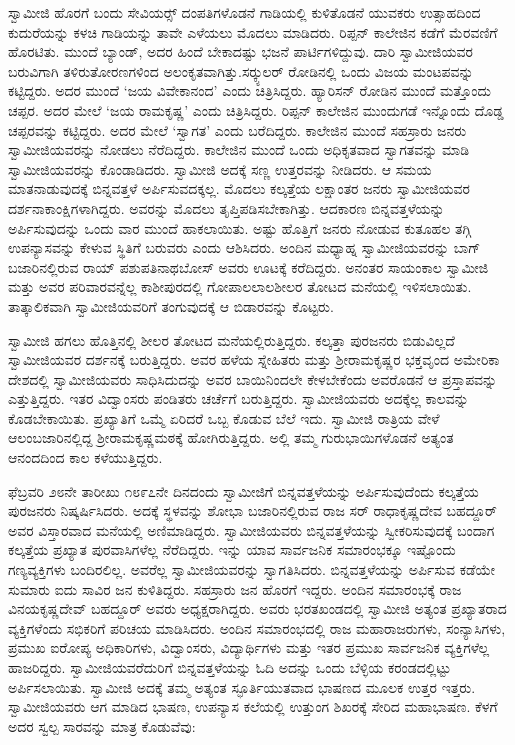  ಸ್ವಾಮೀಜಿ ಹೊರಗೆ ಬಂದು ಸೇವಿಯರ್ಸ್‍‍ ದಂಪತಿಗಳೊಡನೆ ಗಾಡಿಯಲ್ಲಿ ಕುಳಿತೊಡನೆ ಯುವಕರು ಉತ್ಸಾಹದಿಂದ ಕುದುರೆಯನ್ನು ಕಳಚಿ ಗಾಡಿಯನ್ನು ತಾವೇ ಎಳೆಯಲು ಮೊದಲು ಮಾಡಿದರು. ರಿಪ್ಪನ್ ಕಾಲೇಜಿನ ಕಡೆಗೆ ಮೆರವಣಿಗೆ ಹೊರಟಿತು. ಮುಂದೆ ಬ್ಯಾಂಡ್, ಅದರ ಹಿಂದೆ ಬೇಕಾದಷ್ಟು ಭಜನೆ ಪಾರ್ಟಿಗಳಿದ್ದುವು. ದಾರಿ ಸ್ವಾಮೀಜಿಯವರ ಬರುವಿಗಾಗಿ ತಳಿರುತೋರಣಗಳಿಂದ ಅಲಂಕೃತವಾಗಿತ್ತು.\break ಸರ್‍ಕ್ಯುಲರ್ ರೋಡಿನಲ್ಲಿ ಒಂದು ವಿಜಯ ಮಂಟಪವನ್ನು ಕಟ್ಟಿದ್ದರು. ಅದರ ಮುಂದೆ ‘ಜಯ ವಿವೇಕಾನಂದ’ ಎಂದು ಚಿತ್ರಿಸಿದ್ದರು. ಹ್ಯಾರಿಸನ್ ರೋಡಿನ ಮುಂದೆ ಮತ್ತೊಂದು ಚಪ್ಪರ. ಅದರ ಮೇಲೆ ‘ಜಯ ರಾಮಕೃಷ್ಣ’ ಎಂದು ಚಿತ್ರಿಸಿದ್ದರು. ರಿಪ್ಪನ್ ಕಾಲೇಜಿನ ಮುಂದುಗಡೆ ಇನ್ನೊಂದು ದೊಡ್ಡ ಚಪ್ಪರವನ್ನು ಕಟ್ಟಿದ್ದರು. ಅದರ ಮೇಲೆ ‘ಸ್ವಾಗತ’ ಎಂದು ಬರೆದಿದ್ದರು. ಕಾಲೇಜಿನ ಮುಂದೆ ಸಹಸ್ರಾರು ಜನರು ಸ್ವಾಮೀಜಿಯವರನ್ನು ನೋಡಲು ನೆರೆದಿದ್ದರು. ಕಾಲೇಜಿನ ಮುಂದೆ ಒಂದು ಅಧಿಕೃತವಾದ ಸ್ವಾಗತವನ್ನು ಮಾಡಿ ಸ್ವಾಮೀಜಿಯವರನ್ನು ಕೊಂಡಾಡಿದರು. ಸ್ವಾಮೀಜಿ ಅದಕ್ಕೆ ಸಣ್ಣ ಉತ್ತರವನ್ನು ನೀಡಿದರು. ಆ ಸಮಯ ಮಾತನಾಡುವುದಕ್ಕೆ ಬಿನ್ನವತ್ತಳೆ ಅರ್ಪಿಸುವದಕ್ಕಲ್ಲ. ಮೊದಲು ಕಲ್ಕತ್ತೆಯ ಲಕ್ಷಾಂತರ ಜನರು ಸ್ವಾಮೀಜಿಯವರ ದರ್ಶನಾಕಾಂಕ್ಷಿಗಳಾಗಿದ್ದರು. ಅವರನ್ನು ಮೊದಲು ತೃಪ್ತಿಪಡಿಸಬೇಕಾಗಿತ್ತು. ಆದಕಾರಣ ಬಿನ್ನವತ್ತಳೆಯನ್ನು ಅರ್ಪಿಸುವುದನ್ನು ಒಂದು ವಾರ ಮುಂದೆ ಹಾಕಲಾಯಿತು. ಅಷ್ಟು ಹೊತ್ತಿಗೆ ಜನರು ನೋಡುವ ಕುತೂಹಲ ತಗ್ಗಿ ಉಪನ್ಯಾಸವನ್ನು ಕೇಳುವ ಸ್ಥಿತಿಗೆ ಬರುವರು ಎಂದು ಆಶಿಸಿದರು. ಅಂದಿನ ಮಧ್ಯಾಹ್ನ ಸ್ವಾಮೀಜಿಯವರನ್ನು ಬಾಗ್ ಬಜಾರಿನಲ್ಲಿರುವ ರಾಯ್ ಪಶುಪತಿನಾಥಬೋಸ್ ಅವರು ಊಟಕ್ಕೆ ಕರೆದಿದ್ದರು. ಅನಂತರ ಸಾಯಂಕಾಲ ಸ್ವಾಮೀಜಿ ಮತ್ತು ಅವರ ಪರಿವಾರವನ್ನೆಲ್ಲ ಕಾಶೀಪುರದಲ್ಲಿ ಗೋಪಾಲಲಾಲಶೀಲರ ತೋಟದ ಮನೆಯಲ್ಲಿ ಇಳಿಸಲಾಯಿತು. ತಾತ್ಕಾಲಿಕವಾಗಿ ಸ್ವಾಮೀಜಿಯವರಿಗೆ ತಂಗುವುದಕ್ಕೆ ಆ ಬಿಡಾರವನ್ನು ಕೊಟ್ಟರು. 

 ಸ್ವಾಮೀಜಿ ಹಗಲು ಹೊತ್ತಿನಲ್ಲಿ ಶೀಲರ ತೋಟದ ಮನೆಯಲ್ಲಿರುತ್ತಿದ್ದರು. ಕಲ್ಕತ್ತಾ ಪುರಜನರು ಬಿಡುವಿಲ್ಲದೆ ಸ್ವಾಮೀಜಿಯವರ ದರ್ಶನಕ್ಕೆ ಬರುತ್ತಿದ್ದರು. ಅವರ ಹಳೆಯ ಸ್ನೇಹಿತರು ಮತ್ತು ಶ‍್ರೀರಾಮಕೃಷ್ಣರ ಭಕ್ತವೃಂದ ಅಮೇರಿಕಾ ದೇಶದಲ್ಲಿ ಸ್ವಾಮೀಜಿಯವರು ಸಾಧಿಸಿದುದನ್ನು ಅವರ ಬಾಯಿನಿಂದಲೇ ಕೇಳಬೇಕೆಂದು ಅವರೊಡನೆ ಆ ಪ್ರಸ್ತಾಪವನ್ನು ಎತ್ತುತ್ತಿದ್ದರು. ಇತರ ವಿದ್ವಾಂಸರು ಪಂಡಿತರು ಚರ್ಚೆಗೆ ಬರುತ್ತಿದ್ದರು. ಸ್ವಾಮೀಜಿಯವರು ಅದಕ್ಕೆಲ್ಲ ಕಾಲವನ್ನು ಕೊಡಬೇಕಾಯಿತು. ಪ್ರಖ್ಯಾತಿಗೆ ಒಮ್ಮೆ ಏರಿದರೆ ಒಬ್ಬ ಕೊಡುವ ಬೆಲೆ ಇದು. ಸ್ವಾಮೀಜಿ ರಾತ್ರಿಯ ವೇಳೆ ಆಲಂಬಜಾರಿನಲ್ಲಿದ್ದ ಶ‍್ರೀರಾಮಕೃಷ್ಣಮಠಕ್ಕೆ ಹೋಗಿರುತ್ತಿದ್ದರು. ಅಲ್ಲಿ ತಮ್ಮ ಗುರುಭಾಯಿಗಳೊಡನೆ ಅತ್ಯಂತ ಆನಂದದಿಂದ ಕಾಲ ಕಳೆಯುತ್ತಿದ್ದರು. 

 ಫೆಬ್ರವರಿ ೨೮ನೇ ತಾರೀಖು ೧೮೯೭ನೇ ದಿನದಂದು ಸ್ವಾಮೀಜಿಗೆ ಬಿನ್ನವತ್ತಳೆಯನ್ನು ಅರ್ಪಿಸುವುದೆಂದು ಕಲ್ಕತ್ತೆಯ ಪುರಜನರು ನಿಷ್ಕರ್ಷಿಸಿದರು. ಅದಕ್ಕೆ ಸ್ಥಳವನ್ನು ಶೋಭಾ ಬಜಾರಿನಲ್ಲಿರುವ ರಾಜ ಸರ್ ರಾಧಾಕೃಷ್ಣದೇವ ಬಹದ್ದೂರ್ ಅವರ ವಿಸ್ತಾರವಾದ ಮನೆಯಲ್ಲಿ ಅಣಿಮಾಡಿದ್ದರು. ಸ್ವಾಮೀಜಿಯವರು ಬಿನ್ನವತ್ತಳೆಯನ್ನು ಸ್ವೀಕರಿಸುವುದಕ್ಕೆ ಬಂದಾಗ ಕಲ್ಕತ್ತೆಯ ಪ್ರಖ್ಯಾತ ಪುರವಾಸಿಗಳೆಲ್ಲ ನೆರೆದಿದ್ದರು. ಇನ್ನು ಯಾವ ಸಾರ್ವಜನಿಕ ಸಮಾರಂಭಕ್ಕೂ ಇಷ್ಟೊಂದು ಗಣ್ಯವ್ಯಕ್ತಿಗಳು ಬಂದಿರಲಿಲ್ಲ. ಅವರೆಲ್ಲ ಸ್ವಾಮೀಜಿಯವರನ್ನು ಸ್ವಾಗತಿಸಿದರು. ಬಿನ್ನವತ್ತಳೆಯನ್ನು ಅರ್ಪಿಸುವ ಕಡೆಯೇ ಸುಮಾರು ಐದು ಸಾವಿರ ಜನ ಕುಳಿತಿದ್ದರು. ಸಹಸ್ರಾರು ಜನ ಹೊರಗೆ ಇದ್ದರು. ಅಂದಿನ ಸಮಾರಂಭಕ್ಕೆ ರಾಜ ವಿನಯಕೃಷ್ಣದೇವ್ ಬಹದ್ದೂರ್ ಅವರು ಅಧ್ಯಕ್ಷರಾಗಿದ್ದರು. ಅವರು ಭರತಖಂಡದಲ್ಲಿ ಸ್ವಾಮೀಜಿ ಅತ್ಯಂತ ಪ್ರಖ್ಯಾತರಾದ ವ್ಯಕ್ತಿಗಳೆಂದು ಸಭಿಕರಿಗೆ ಪರಿಚಯ ಮಾಡಿಸಿದರು. ಅಂದಿನ ಸಮಾರಂಭದಲ್ಲಿ ರಾಜ ಮಹಾರಾಜರುಗಳು, ಸಂನ್ಯಾಸಿಗಳು, ಪ್ರಮುಖ ಐರೋಪ್ಯ ಅಧಿಕಾರಿಗಳು, ವಿದ್ವಾಂಸರು, ವಿದ್ಯಾರ್ಥಿಗಳು ಮತ್ತು ಇತರ ಪ್ರಮುಖ ಸಾರ್ವಜನಿಕ ವ್ಯಕ್ತಿಗಳೆಲ್ಲ ಹಾಜರಿದ್ದರು. ಸ್ವಾಮೀಜಿಯವರೆದುರಿಗೆ ಬಿನ್ನವತ್ತಳೆಯನ್ನು ಓದಿ ಅದನ್ನು ಒಂದು ಬೆಳ್ಳಿಯ ಕರಂಡದಲ್ಲಿಟ್ಟು ಅರ್ಪಿಸಲಾಯಿತು. ಸ್ವಾಮೀಜಿ ಅದಕ್ಕೆ ತಮ್ಮ ಅತ್ಯಂತ ಸ್ಫೂರ್ತಿಯುತವಾದ ಭಾಷಣದ ಮೂಲಕ ಉತ್ತರ ಇತ್ತರು. ಸ್ವಾಮೀಜಿಯವರು ಆಗ ಮಾಡಿದ ಭಾಷಣ, ಉಪನ್ಯಾಸ ಕಲೆಯಲ್ಲಿ ಉತ್ತುಂಗ ಶಿಖರಕ್ಕೆ ಸೇರಿದ ಮಹಾಭಾಷಣ. ಕೆಳಗೆ ಅದರ ಸ್ವಲ್ಪ ಸಾರವನ್ನು ಮಾತ್ರ ಕೊಡುವೆವು: 


